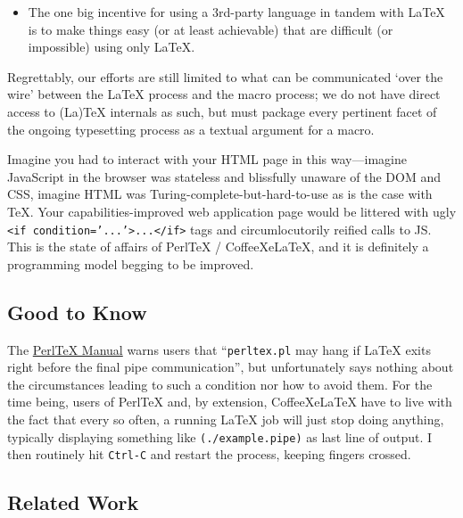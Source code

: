 \begin{itemize}
\itemsep1pt\parskip0pt
\item
  The one big incentive for using a 3rd-party language in tandem with
  LaTeX is to make things easy (or at least achievable) that are
  difficult (or impossible) using only LaTeX.
\end{itemize}

Regrettably, our efforts are still limited to what can be communicated
`over the wire' between the LaTeX process and the macro process; we do
not have direct access to (La)TeX internals as such, but must package
every pertinent facet of the ongoing typesetting process as a textual
argument for a macro.

Imagine you had to interact with your HTML page in this way---imagine
JavaScript in the browser was stateless and blissfully unaware of the
DOM and CSS, imagine HTML was Turing-complete-but-hard-to-use as is the
case with TeX. Your capabilities-improved web application page would be
littered with ugly
\texttt{\textless{}if condition='...'\textgreater{}...\textless{}/if\textgreater{}}
tags and circumlocutorily reified calls to JS. This is the state of
affairs of PerlTeX / CoffeeXeLaTeX, and it is definitely a programming
model begging to be improved.

\subsection{Good to Know}\label{good-to-know}

The
\href{http://mirror.unl.edu/ctan/macros/latex/contrib/perltex/perltex.pdf}{PerlTeX
Manual} warns users that ``\texttt{perltex.pl} may hang if LaTeX exits
right before the final pipe communication'', but unfortunately says
nothing about the circumstances leading to such a condition nor how to
avoid them. For the time being, users of PerlTeX and, by extension,
CoffeeXeLaTeX have to live with the fact that every so often, a running
LaTeX job will just stop doing anything, typically displaying something
like \texttt{(./example.pipe)} as last line of output. I then routinely
hit \texttt{Ctrl-C} and restart the process, keeping fingers crossed.

\subsection{Related Work}\label{related-work}

